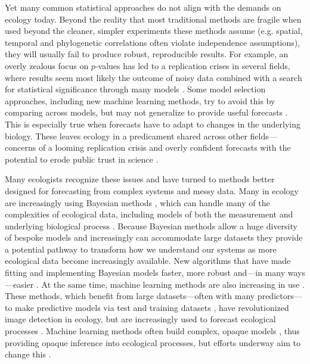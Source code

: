\documentclass[11pt]{article}
\begin{document}
Yet many common statistical approaches do not align with the demands on ecology today. Beyond the reality that most traditional methods are fragile when used beyond the cleaner, simpler experiments these methods assume (e.g. spatial, temporal and phylogenetic correlations often violate independence assumptions), they will usually fail to produce robust, reproducible results. For example, an overly zealous focus on $p$-values has led to a replication crises in several fields, where results seem most likely the outcome of noisy data combined with a search for statistical significance through many models \citep[effectively a garden of forking paths,][]{halsey2015,loken2017}. Some model selection approaches, including new machine learning methods, try to avoid this by comparing across models, but may not generalize to provide useful forecasts \citep{boettiger2022forecast}. This is especially true when forecasts have to adapt to changes in the underlying biology. These leaves ecology in a predicament shared across other fields---concerns of a looming replication crisis \citep{filazzola2021replication,fraser2020role} and overly confident forecasts with the potential to erode public trust in science \citep{leroux2019prevalence,boettiger2022forecast}. 

Many ecologists recognize these issues and have turned to methods better designed for forecasting from complex systems and messy data. Many in ecology are increasingly using Bayesian methods \citep{anderson2021trends}, which can handle many of the complexities of ecological data, including models of both the measurement and underlying biological process \citep{hobbs2006alternatives}. Because Bayesian methods allow a huge diversity of bespoke models and increasingly can accommodate large datasets they provide a potential pathway to transform how we understand our systems as more ecological data become increasingly available. New algorithms \citep[e.g. Hamiltonian Monte Carlo,][]{nuts2014,betan2019} that have made fitting and implementing Bayesian models faster, more robust and---in many ways---easier \citep{Carpenter:2017stan}. At the same time, machine learning methods are also increasing in use \citep{pichler2023machine}. These methods, which benefit from large datasets---often with many predictors---to make predictive models via test and training datasets \citep{breiman2001statistical}, have revolutionized image detection in ecology, but are increasingly used to forecast ecological processes \citep[e.g.,][]{zwart2023near}. Machine learning methods often build complex, opaque models \citep{breiman2001statistical,shmueli2010explain}, thus providing opaque inference into ecological processes, but efforts underway aim to change this \citep[e.g.,][]{kutz2023machine}. 
\end{document}
